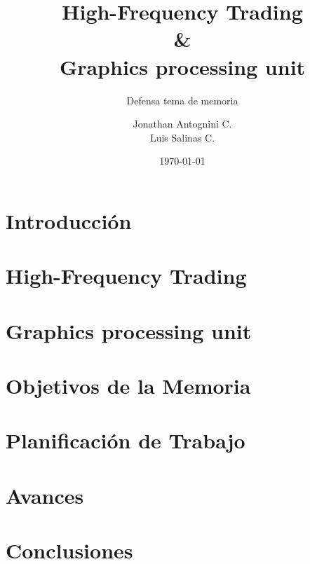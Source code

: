 \documentclass{beamer}
\title{High-Frequency Trading \\ \& \\ Graphics processing unit}
\subtitle{Defensa tema de memoria}
\author{Jonathan Antognini C.\\
		Luis Salinas C.}
\institute[]{Universidad Técnica Federico Santa María}
\date{\today}
\begin{document}
    \frame{\titlepage}
    \frame{\tableofcontents}
	\section{Introducción}
		
	\section{High-Frequency Trading}
		
	\section{Graphics processing unit}
		
	\section{Objetivos de la Memoria}
		
	\section{Planificación de Trabajo}
		
	\section{Avances}
		
	\section{Conclusiones}
		
\end{document}
